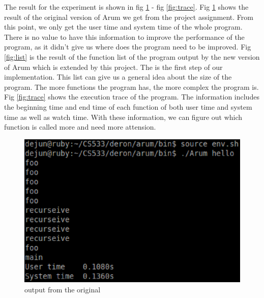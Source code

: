 \documentclass[11pt,letterpaper,oneside]{article}
\begin{document}
The result for the experiment is shown in fig \ref{fig:orig} - fig \ref{fig:trace}. Fig \ref{fig:orig} shows the result of the original version of Arum we get from the project assignment. From this point, we only get the user time and system time of the whole program. There is no value to have this information to improve the performance of the program, as it didn't give us where does the program need to be improved. Fig \ref{fig:list} is the result of the function list of the program output by the new version of Arum which is extended by this project. The is the first step of our implementation. This list can give us a general idea about the size of the program. The more functions the program has, the more complex the program is. Fig \ref{fig:trace} shows the execution trace of the program. The information includes the beginning time and end time of each function of both user time and system time as well as watch time. With these information, we can figure out which function is called more and need more attension.
\begin{figure}
\begin{center}
\includegraphics[width=6in]{fig1.eps}
\caption{output from the original}
\label{fig:orig}
\end{center}
\end{figure}
\end{document}
